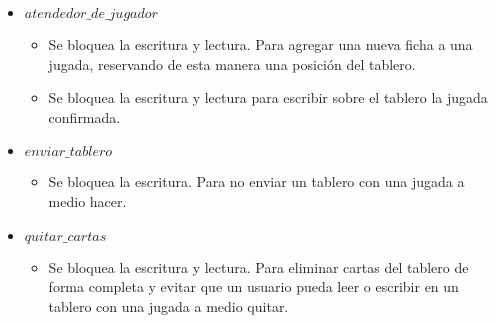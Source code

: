 \begin{itemize}

\item $atendedor\_de\_jugador$

\begin{itemize}
\item Se bloquea la escritura y lectura. Para agregar una nueva ficha a una jugada, reservando de esta manera una posición del tablero.

\item Se bloquea la escritura y lectura para escribir sobre el tablero la jugada confirmada.

\end{itemize}

\item $enviar\_tablero$

\begin{itemize}

\item Se bloquea la escritura. Para no enviar un tablero con una jugada a medio hacer.

\end{itemize}

\item $quitar\_cartas$

\begin{itemize}

\item Se bloquea la escritura y lectura. Para eliminar cartas del tablero de forma completa y evitar que un usuario pueda leer o escribir en un tablero con una jugada a medio quitar.

\end{itemize}

\end{itemize}